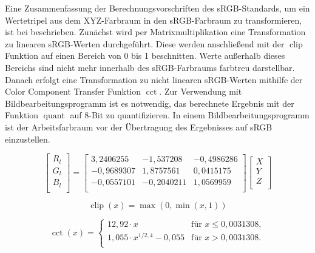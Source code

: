 \documentclass[10pt,a4paper,DIV=12,parskip=half]{scrarticle}
\begin{document}
Eine Zusammenfassung der Berechnungsvorschriften des sRGB-Standards, um ein Wertetripel aus dem XYZ-Farbraum in den sRGB-Farbraum zu transformieren, ist bei \cite{W3C2015} beschrieben. Zunächst wird per Matrixmultiplikation eine Transformation zu linearen sRGB-Werten durchgeführt. Diese werden anschließend mit der $\operatorname{clip}$ Funktion auf einen Bereich von 0 bis 1 beschnitten. Werte außerhalb dieses Bereichs sind nicht mehr innerhalb des sRGB-Farbraums farbtreu darstellbar. Danach erfolgt eine Transformation zu nicht linearen sRGB-Werten mithilfe der Color Component Transfer Funktion $\operatorname{cct}$. Zur Verwendung mit Bildbearbeitungsprogramm ist es notwendig, das berechnete Ergebnis mit der Funktion $\operatorname{quant}$ auf 8-Bit zu quantifizieren. In einem Bildbearbeitungsprogramm ist der Arbeitsfarbraum vor der Übertragung des Ergebnisses auf sRGB einzustellen.

\begin{equation*}
\begin{bmatrix}
R_{l} \\
G_{l} \\
B_{l} \\
\end{bmatrix} =
\begin{bmatrix}
3,2406255 & -1,537208 & -0,4986286 \\
-0,9689307 & 1,8757561 & 0,0415175 \\
-0,0557101 & -0,2040211 & 1,0569959 \\
\end{bmatrix}
\begin{bmatrix}
X \\
Y \\
Z \\
\end{bmatrix}
\end{equation*}

\begin{equation*}
\operatorname{clip}(x)=\operatorname{max}(0, \operatorname{min}(x, 1))
\end{equation*}

\begin{equation*}
\operatorname{cct}(x)=
\begin{cases}
12,92 \cdot x & \text{für } x \leq 0,0031308, \\
1,055 \cdot x^{1/2,4} - 0,055 & \text{für } x > 0,0031308. \\
\end{cases}
\end{equation*}
\end{document}

